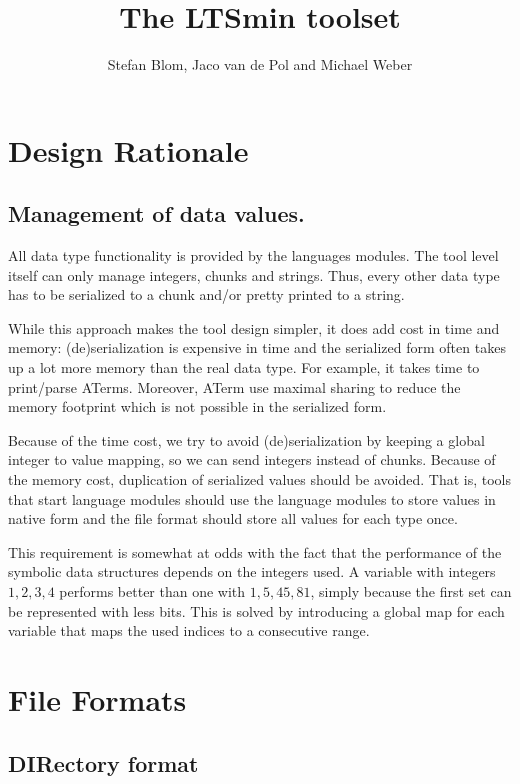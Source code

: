 \documentclass{report}
\title{The LTSmin toolset}
\author{Stefan Blom, Jaco van de Pol and Michael Weber}
\theoremstyle{plain}
\begin{document}
\maketitle

\tableofcontents


\chapter{Design Rationale}

\section{Management of data values.}

All data type functionality is provided by the languages modules.
The tool level itself can only manage integers, chunks and strings.
Thus, every other data type has to be serialized to a chunk
and/or pretty printed to a string.

While this approach makes the tool design simpler, it does add cost
in time and memory: (de)serialization is expensive in time and the
serialized form often takes up a lot more memory than the real data
type. For example, it takes time to print/parse ATerms. Moreover,
ATerm use maximal sharing to reduce the memory footprint which is not
possible in the serialized form.

Because of the time cost, we try to avoid (de)serialization by
keeping a global integer to value mapping, so we can send integers
instead of chunks. Because of the memory cost, duplication of
serialized values should be avoided. That is, tools that start language
modules should use the language modules to store values in native form
and the file format should store all values for each type once.

This requirement is somewhat at odds with the fact that the performance
of the symbolic data structures depends on the integers used.
A variable with integers $1,2,3,4$ performs better than one with
$1,5,45,81$, simply because the first set can be represented with less bits.
This is solved by introducing a global map for each variable that maps
the used indices to a consecutive range.


\chapter{File Formats}

\section{DIRectory format}
\end{document}
